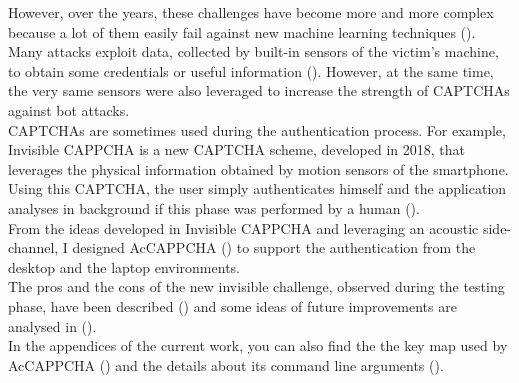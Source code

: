 However, over the years, these challenges have become more and more complex because a lot of them easily fail against new machine learning techniques ().\\
Many attacks exploit data, collected by built-in sensors of the victim's machine, to obtain some credentials or useful information (). However, at the same time, the very same sensors were also leveraged to increase the strength of CAPTCHAs against bot attacks.\\
CAPTCHAs are sometimes used during the authentication process. For example, Invisible CAPPCHA is a new CAPTCHA scheme, developed in 2018, that leverages the physical information obtained by motion sensors of the smartphone\cite{Invisible_CAPPCHA}. Using this CAPTCHA, the user simply authenticates himself and the application analyses in background if this phase was performed by a human ().\\
From the ideas developed in Invisible CAPPCHA and leveraging an acoustic side-channel, I designed AcCAPPCHA () to support the authentication from the desktop and the laptop environments.\\
The pros and the cons of the new invisible challenge, observed during the testing phase, have been described () and some ideas of future improvements are analysed in ().\\
In the appendices of the current work, you can also find the the key map used by AcCAPPCHA () and the details about its command line arguments ().